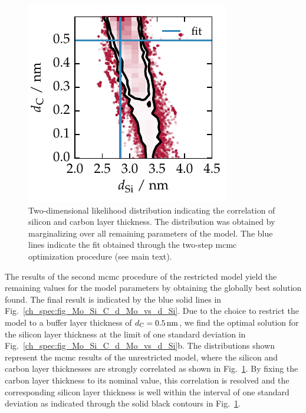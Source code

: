 \begin{figure}[htbp]
\centering
\includegraphics{img/Mo_Si_C_correlation_Si_C}
\caption[Correlation of silicon and carbon layer thickness parameters in the Mo/Si/C model.]{Two-dimensional likelihood distribution indicating the correlation of silicon and carbon layer thickness. The distribution was obtained by marginalizing over all remaining parameters of the model. The blue lines indicate the fit obtained through the two-step \gls{mcmc} optimization procedure (see main text).}
\label{ch_spec:fig_Mo_Si_C_correlation_Si_C}
\end{figure}
The results of the second \gls{mcmc} procedure of the restricted model yield the remaining values for the model parameters by obtaining the globally best solution found. The final result is indicated by the blue solid lines in Fig.~\ref{ch_spec:fig_Mo_Si_C_d_Mo_vs_d_Si}. Due to the choice to restrict the model to a buffer layer thickness of $d_\text{C} = \nm{0.5}$, we find the optimal solution for the silicon layer thickness at the limit of one standard deviation in Fig.~\ref{ch_spec:fig_Mo_Si_C_d_Mo_vs_d_Si}b. The distributions shown represent the \gls{mcmc} results of the unrestricted model, where the silicon and carbon layer thicknesses are strongly correlated as shown in Fig.~\ref{ch_spec:fig_Mo_Si_C_correlation_Si_C}. By fixing the carbon layer thickness to its nominal value, this correlation is resolved and the corresponding silicon layer thickness is well within the interval of one standard deviation as indicated through the solid black contours in Fig.~\ref{ch_spec:fig_Mo_Si_C_correlation_Si_C}.

